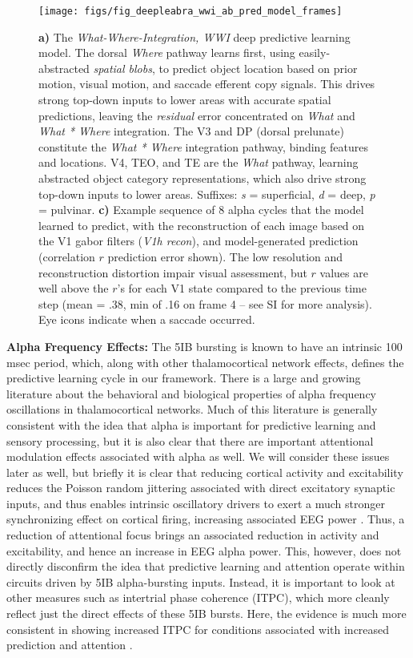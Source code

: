 \documentclass[11pt,twoside]{article}
\newif\myifpdf
\begin{document}
\begin{figure}
  \centering\texttt{[image: figs/fig\_deepleabra\_wwi\_ab\_pred\_model\_frames]}
  \caption{{\bf a)} The \emph{What-Where-Integration, WWI} deep predictive learning model. The dorsal \emph{Where} pathway learns first, using easily-abstracted \emph{spatial blobs}, to predict object location based on prior motion, visual motion, and saccade efferent copy signals.  This drives strong top-down inputs to lower areas with accurate spatial predictions, leaving the \emph{residual} error concentrated on \emph{What} and \emph{What * Where} integration.  The V3 and DP (dorsal prelunate) constitute the \emph{What * Where} integration pathway, binding features and locations.  V4, TEO, and TE are the \emph{What} pathway, learning abstracted object category representations, which also drive strong top-down inputs to lower areas.  Suffixes: \emph{s} = superficial, \emph{d} = deep, \emph{p} = pulvinar. {\bf c)} Example sequence of 8 alpha cycles that the model learned to predict, with the reconstruction of each image based on the V1 gabor filters (\emph{V1h recon}), and model-generated prediction (correlation $r$ prediction error shown).  The low resolution and reconstruction distortion impair visual assessment, but $r$ values are well above the $r$'s for each V1 state compared to the previous time step (mean = .38, min of .16 on frame 4 -- see SI for more analysis).  Eye icons indicate when a saccade occurred.}
  \label{fig.model}
\end{figure}

{\bf Alpha Frequency Effects:} The 5IB bursting is known to have an intrinsic 100 msec period, which, along with other thalamocortical network effects, defines the predictive learning cycle in our framework.  There is a large and growing literature about the behavioral and biological properties of alpha frequency oscillations in thalamocortical networks.  Much of this literature is generally consistent with the idea that alpha is important for predictive learning and sensory processing, but it is also clear that there are important attentional modulation effects associated with alpha as well.  We will consider these issues later as well, but briefly it is clear that reducing cortical activity and excitability reduces the Poisson random jittering associated with direct excitatory synaptic inputs, and thus enables intrinsic oscillatory drivers to exert a much stronger synchronizing effect on cortical firing, increasing associated EEG power \cite{ZhouSchaferDesimone16,KlimeschSausengHanslmayr07,JensenMazaheri10}.  Thus, a reduction of attentional focus brings an associated reduction in activity and excitability, and hence an increase in EEG alpha power.  This, however, does not directly disconfirm the idea that predictive learning and attention operate within circuits driven by 5IB alpha-bursting inputs.  Instead, it is important to look at other measures such as intertrial phase coherence (ITPC), which more cleanly reflect just the direct effects of these 5IB bursts.  Here, the evidence is much more consistent in showing increased ITPC for conditions associated with increased prediction and attention \cite{MaryPapers,MayerSchwiedrzikWibralEtAl16}.
\end{document}
